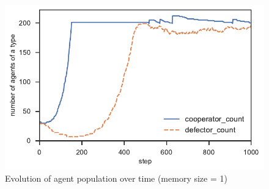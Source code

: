 \documentclass[english]{article}
\begin{document}



\begin{figure}[h!]
  \centering
  \includegraphics{frequency_time_with_memory.pdf}
  \caption{Evolution of agent population over time (memory size = 1)}
  \label{table:population_evolution}
\end{figure}
\end{document}
